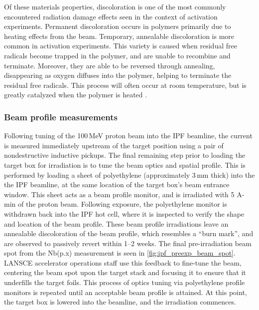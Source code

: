 Of these materials properties, discoloration is one of the most commonly encountered radiation damage effects seen in the context of activation experiments.
Permanent discoloration occurs in polymers primarily due to heating effects from the beam.
Temporary, annealable discoloration is more common in activation experiments.
This variety is caused when residual free radicals become trapped in the polymer, and are unable to recombine and terminate.
Moreover, they are able to be reversed through annealing, disappearing as oxygen diffuses into the polymer, helping to terminate the residual free radicals.
This process will often occur at room temperature, but is greatly catalyzed when the polymer is heated \cite{international1999iaea,Davenas2002}.





\subsubsection{\label{sec:nb_profile_measurements}Beam profile measurements}



Following  tuning of the 100\,MeV proton beam into the IPF beamline, the current is measured immediately upstream of the target position using a pair of nondestructive inductive pickups.
The final remaining step prior to loading the  target box for irradiation is to tune the beam optics and spatial profile.
This is performed by loading a sheet of polyethylene (approximately 3\,mm thick) into the the IPF beamline, at the same location of the target box's beam entrance window. 
This sheet acts as a beam profile monitor, and is irradiated with 5 \mmicro A-min of the proton beam.
Following exposure, the polyethylene monitor is withdrawn back into the IPF hot cell, where it is inspected to verify the shape and location of the beam profile.
These beam profile irradiations leave an annealable discoloration of the beam profile, which resembles a \enquote{burn mark}, and are observed to passively revert within 1--2 weeks.
The final pre-irradiation beam spot from the Nb(p.x) measurement is seen in  \autoref{fig:ipf_preexp_beam_spot}.
LANSCE accelerator operations staff use this feedback to fine-tune the beam, centering the beam spot upon the target stack and focusing it to ensure that it underfills the target foils.
This process of  optics tuning via polyethylene profile monitors is repeated until an acceptable beam profile is attained.
At this point, the target box is lowered into the beamline, and the irradiation commences.
 








